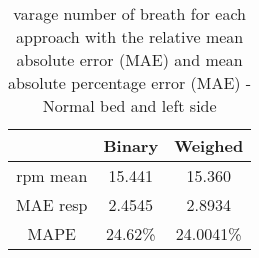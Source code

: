 \begin{table}[H]
    \centering

    \begin{tabular}{|c|c|c|}
    \hline 
    & Binary  & Weighed \\ 
    
    \hline 
    rpm mean & 15.441 & 15.360\\
    MAE resp  &   2.4545 &  2.8934 \\ 
    MAPE  & 24.62\% & 24.0041\% \\ 
    \hline 

    \end{tabular}
    \caption{varage number of breath for each approach with the relative mean
    absolute error (MAE) and mean absolute percentage error (MAE) - Normal bed
    and left side}
    \label{tab:LeftNormalStillMetrics}

    \end{table}
    